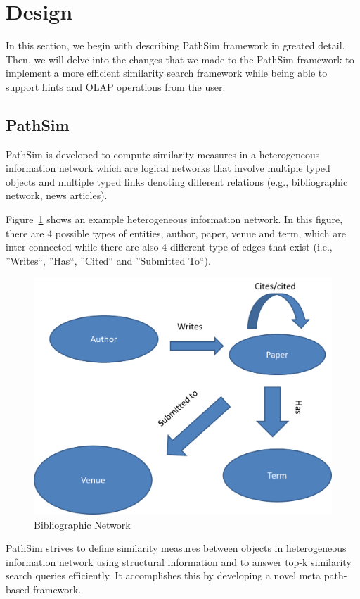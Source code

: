 \section{Design}
\label{sec:design}

In this section, we begin with describing PathSim framework in greated detail.
Then, we will delve into the changes that we made to the PathSim framework to
implement a more efficient similarity search framework while being able to
support hints and OLAP operations from the user.

\subsection{PathSim}

PathSim is developed to compute
similarity measures in a heterogeneous information network which are logical
networks that involve multiple typed objects and multiple typed links denoting
different relations (e.g., bibliographic network, news articles).

Figure~\ref{fig:relationship} shows an example heterogeneous information
network.  In this figure, there are 4 possible types of entities, author,
paper, venue and term, which are inter-connected while there are also 4
different type of edges that exist (i.e., ''Writes``, ''Has``, ''Cited`` and
''Submitted To``).

\begin{figure}[H]
    \centering
    \includegraphics[width=0.6\linewidth]{./figs/relationship.png}
    \caption{Bibliographic Network}
    \label{fig:relationship}
\end{figure}

PathSim strives to define similarity measures between objects in heterogeneous
information network using structural information and to answer top-k similarity
search queries efficiently. It accomplishes this by developing a novel meta
path-based framework.


